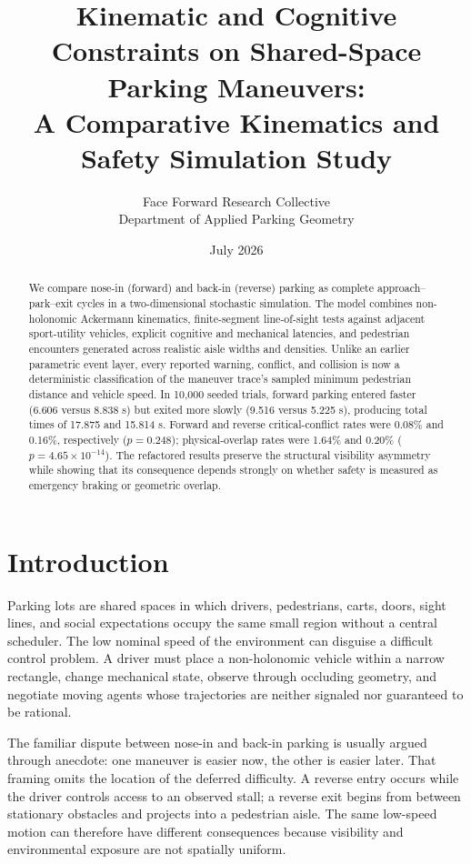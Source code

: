 \documentclass[11pt]{article}
\title{Kinematic and Cognitive Constraints on Shared-Space Parking Maneuvers:\\
A Comparative Kinematics and Safety Simulation Study}
\author{Face Forward Research Collective\\
\small Department of Applied Parking Geometry}
\date{July 2026}
\begin{document}
\maketitle

\begin{abstract}
We compare nose-in (forward) and back-in (reverse) parking as complete approach--park--exit cycles in a two-dimensional stochastic simulation. The model combines non-holonomic Ackermann kinematics, finite-segment line-of-sight tests against adjacent sport-utility vehicles, explicit cognitive and mechanical latencies, and pedestrian encounters generated across realistic aisle widths and densities. Unlike an earlier parametric event layer, every reported warning, conflict, and collision is now a deterministic classification of the maneuver trace's sampled minimum pedestrian distance and vehicle speed. In 10,000 seeded trials, forward parking entered faster (6.606 versus 8.838 s) but exited more slowly (9.516 versus 5.225 s), producing total times of 17.875 and 15.814 s. Forward and reverse critical-conflict rates were 0.08\% and 0.16\%, respectively ($p=0.248$); physical-overlap rates were 1.64\% and 0.20\% ($p=4.65\times10^{-14}$). The refactored results preserve the structural visibility asymmetry while showing that its consequence depends strongly on whether safety is measured as emergency braking or geometric overlap.
\end{abstract}

\section{Introduction}

Parking lots are shared spaces in which drivers, pedestrians, carts, doors, sight lines, and social expectations occupy the same small region without a central scheduler. The low nominal speed of the environment can disguise a difficult control problem. A driver must place a non-holonomic vehicle within a narrow rectangle, change mechanical state, observe through occluding geometry, and negotiate moving agents whose trajectories are neither signaled nor guaranteed to be rational.

The familiar dispute between nose-in and back-in parking is usually argued through anecdote: one maneuver is easier now, the other is easier later. That framing omits the location of the deferred difficulty. A reverse entry occurs while the driver controls access to an observed stall; a reverse exit begins from between stationary obstacles and projects into a pedestrian aisle. The same low-speed motion can therefore have different consequences because visibility and environmental exposure are not spatially uniform.
\end{document}
